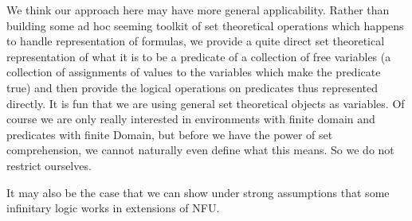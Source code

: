 \documentclass{slides}
\begin{document}
\begin{slide}

We think our approach here may have more general applicability.  Rather than building some ad hoc seeming toolkit of set theoretical operations which happens to handle representation of formulas, we provide a quite direct set theoretical representation of what it is
to be a predicate of a collection of free variables (a collection of assignments of values to the variables which make the predicate true)
and then provide the logical operations on predicates thus represented directly.  It is fun that we are using general set theoretical
objects as variables.  Of course we are only really interested in environments with finite domain and predicates with finite Domain, but before we have the power of set comprehension, we cannot naturally even define what this means.  So we do not restrict ourselves.

It may also be the case that we can show under strong assumptions that some infinitary logic works in extensions of NFU.



\end{slide}
\end{document}
